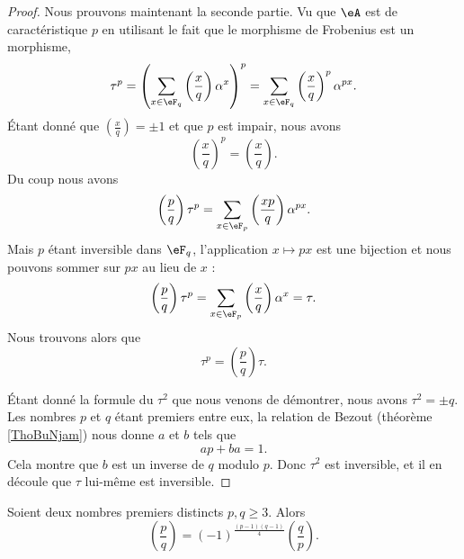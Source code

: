 \begin{proof}
    Nous prouvons maintenant la seconde partie. Vu que \( \eA\) est de caractéristique \( p\) en utilisant le fait que le morphisme de Frobenius est un morphisme,
    \begin{equation}
        \tau^p=\left( \sum_{x\in \eF_q}\left(\frac{x}{q}\right)\alpha^x \right)^p=\sum_{x\in \eF_q}\left(\frac{x}{q}\right)^p\alpha^{px}.
    \end{equation}
    Étant donné que \( \left(\frac{x}{q}\right)=\pm 1\) et que \( p\) est impair, nous avons
    \begin{equation}
        \left(\frac{x}{q}\right)^p=\left(\frac{x}{q}\right).
    \end{equation}
    Du coup nous avons
    \begin{equation}
        \left(\frac{p}{q}\right)\tau^p=\sum_{x\in \eF_p}\left(\frac{xp}{q}\right)\alpha^{px}.
    \end{equation}
    Mais \( p\) étant inversible dans \( \eF_q\), l'application \( x\mapsto px\) est une bijection et nous pouvons sommer sur \( px\) au lieu de \( x\) :
    \begin{equation}
        \left(\frac{p}{q}\right)\tau^p=\sum_{x\in \eF_p}\left(\frac{x}{q}\right)\alpha^x=\tau.
    \end{equation}
    Nous trouvons alors que
    \begin{equation}
        \tau^p=\left(\frac{p}{q}\right)\tau.
    \end{equation}

    Étant donné la formule du \( \tau^2\) que nous venons de démontrer, nous avons \( \tau^2=\pm q\). Les nombres \( p\) et \( q\) étant premiers entre eux, la relation de Bezout (théorème \ref{ThoBuNjam}) nous donne \( a\) et \( b\) tels que
    \begin{equation}
        ap+ba=1.
    \end{equation}
    Cela montre que \( b\) est un inverse de \( q\) modulo \( p\). Donc \( \tau^2\) est inversible, et il en découle que \( \tau\) lui-même est inversible.
\end{proof}

\begin{theorem}  \label{ThoMiEiUm}
    Soient deux nombres premiers distincts \( p,q\geq 3\). Alors
    \begin{equation}
        \left(\frac{p}{q}\right)=(-1)^{\frac{ (p-1)(q-1) }{ 4 }}\left(\frac{q}{p}\right).
    \end{equation}
\end{theorem}

